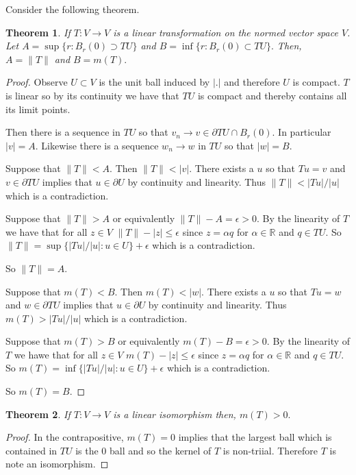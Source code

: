 \documentclass[letter]{article}
\newtheorem{theorem}{Theorem}
\newenvironment{menumerate}{%
  \edef\backupindent{\the\parindent}%
  \enumerate%
  \setlength{\parindent}{\backupindent}%
}{\endenumerate}
\begin{document}
\begin{menumerate}
	\setcounter{enumi}{3}
	\item 

	Consider the following theorem.
	\begin{theorem}
		If $T:V\to V$ is a linear transformation on the normed vector space $V$. Let $A = \sup\{r : B_r(0) \supset TU\}$
		and $B = \inf \{r : B_r(0) \subset TU\}.$ Then, $A = \|T\|$ and $B = m(T).$
	\end{theorem}
	\begin{proof}
		Observe $U \subset V$ is the unit ball induced by $| . |$ and therefore $U$ is compact.
		$T$ is linear so by its continuity we have that $TU$ is compact and
		thereby contains all its limit points.

		Then there is a sequence in $TU$ so that $v_n \to v \in \partial TU \cap B_r(0).$
		In particular $|v| = A.$ Likewise there is a sequence $w_n \to w$ in $TU$ so that $|w| = B.$

		Suppose that $\|T\| < A.$ Then $\|T\| < |v|.$ There exists a $u$
		so that $Tu = v$ and $v \in \partial TU$ implies that $u \in \partial U$ by continuity and linearity.
		Thus $\|T\| < |Tu|/|u|$ which is a contradiction. 

		Suppose that $\|T\| > A$ or equivalently $\|T\| -A = \epsilon > 0.$ By the linearity of $T$
		we have that for all $z \in V$  $\|T\| - |z| \leq \epsilon$ since $ z = \alpha q$ for $\alpha \in \mathbb{R}$
		and $q \in TU.$ So $\|T\| = \sup\{|Tu|/|u| : u \in U\} + \epsilon$ which is a contradiction.

		So $\|T\| = A.$ 


		Suppose that $m(T)  < B.$ Then $m(T) < |w|.$ There exists a $u$
		so that $Tu = w$ and $w \in \partial TU$ implies that $u \in \partial U$ by continuity and linearity.
		Thus $m(T) > |Tu|/|u|$ which is a contradiction. 

		Suppose that $m(T) > B$ or equivalently $m(T) -B = \epsilon > 0.$ By the linearity of $T$
		we hawe that for all $z \in V$  $m(T) - |z| \leq \epsilon$ since $ z = \alpha q$ for $\alpha \in \mathbb{R}$
		and $q \in TU.$ So $m(T) = \inf\{|Tu|/|u| : u \in U\} + \epsilon$ which is a contradiction.

		So $m(T) = B.$ 
	\end{proof}

	\begin{theorem}
		If $T:V\to V$ is a linear isomorphism then, $m(T) > 0.$
	\end{theorem}
	\begin{proof}
		In the contrapositive, $m(T) = 0$ implies that the largest ball which is contained
		in $TU$ is the $0$ ball and so the kernel of $T$ is non-triial. Therefore $T$ is note an isomorphism.


\end{proof}
\end{menumerate}
\end{document}
